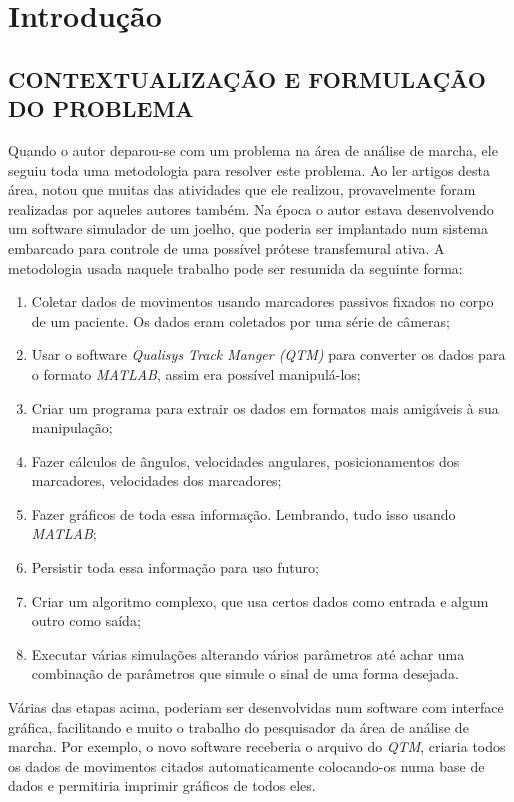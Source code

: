 \chapter[INTRODUÇÃO]{\textbf {Introdução}}
\section{CONTEXTUALIZAÇÃO E FORMULAÇÃO DO PROBLEMA}
Quando o autor deparou-se com um problema na área de análise de marcha, 
ele seguiu toda uma metodologia para resolver este problema. 
Ao ler artigos desta área, notou que muitas das atividades que ele realizou, provavelmente foram realizadas por aqueles autores também. 
Na época o autor estava desenvolvendo um software simulador de um joelho, que poderia ser implantado num sistema embarcado para controle de uma possível prótese transfemural ativa.
A metodologia usada naquele trabalho pode ser resumida da seguinte forma:
\begin{enumerate}
	\item Coletar dados de movimentos usando marcadores passivos fixados no corpo de um paciente. Os dados eram coletados por uma série de câmeras;
	\item Usar o software \emph{Qualisys Track Manger (QTM)} \cite{Qualisys2010} para converter os dados para o formato \emph{MATLAB}, assim era possível manipulá-los;
	\item Criar um programa para extrair os dados em formatos mais amigáveis à sua manipulação;
	\item Fazer cálculos de ângulos, velocidades angulares, posicionamentos dos marcadores, velocidades dos marcadores;
	\item Fazer gráficos de toda essa informação. Lembrando, tudo isso usando \emph{MATLAB};
	\item Persistir toda essa informação para uso futuro;
	\item Criar um algoritmo complexo, que usa certos dados como entrada e algum outro como saída;
	\item Executar várias simulações alterando vários parâmetros até achar uma combinação de parâmetros que simule o sinal de uma forma desejada.
\end{enumerate}

Várias das etapas acima, poderiam ser desenvolvidas num software com interface gráfica, facilitando e muito o trabalho do pesquisador da área de análise de marcha. Por exemplo, o novo software receberia o arquivo do \emph{QTM}, criaria todos os dados de movimentos citados automaticamente colocando-os numa base de dados e permitiria imprimir gráficos de todos eles.

